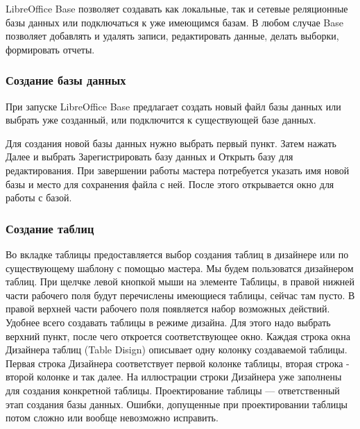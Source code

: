 \documentclass[a4paper]{article}
\begin{document}
LibreOffice Base позволяет создавать как локальные, так и сетевые реляционные базы данных или подключаться к уже имеющимся базам. В любом случае Base позволяет добавлять и удалять записи, редактировать данные, делать выборки, формировать отчеты.

\subsubsection{Создание базы данных}
При запуске LibreOffice Base предлагает создать новый файл базы данных или выбрать уже созданный, или подключится к существующей базе данных.

Для создания новой базы данных нужно выбрать первый пункт. Затем нажать Далее и выбрать Зарегистрировать базу данных и Открыть базу для редактирования. При завершении работы мастера потребуется указать имя новой базы и место для сохранения файла с ней. После этого открывается окно для работы с базой.

\begin{figure}[h]
\end{figure}

\subsubsection{Создание таблиц}

Во вкладке таблицы предоставляется выбор создания таблиц в дизайнере или по существующему шаблону с помощью мастера. Мы будем пользоватся дизайнером таблиц. При щелчке левой кнопкой мыши на элементе Таблицы, в правой нижней части рабочего поля будут перечислены имеющиеся таблицы, сейчас там пусто. В правой верхней части рабочего поля появляется набор возможных действий. Удобнее всего создавать таблицы в режиме дизайна. Для этого надо выбрать верхний пункт, после чего откроется соответствующее окно. Каждая строка окна Дизайнера таблиц (Table Disign) описывает одну колонку создаваемой таблицы. Первая строка Дизайнера соответствует первой колонке таблицы, вторая строка - второй колонке и так далее. На иллюстрации строки Дизайнера уже заполнены для создания конкретной таблицы. Проектирование таблицы --- ответственный этап создания базы данных. Ошибки, допущенные при проектировании таблицы потом сложно или вообще невозможно исправить.
\end{document}
